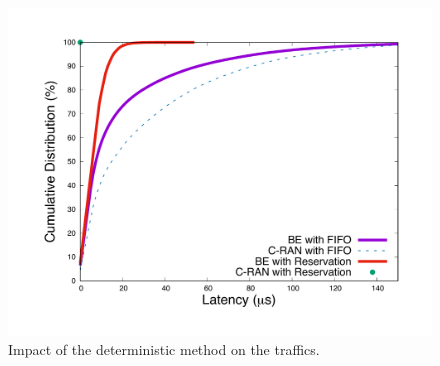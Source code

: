\documentclass[10pt, conference, letterpaper]{IEEEtran}
\begin{document}
  
  
  \begin{figure}[h!]
\begin{center}   

     \includegraphics[scale=0.25]{optim.pdf}
     \caption{Impact of the deterministic method on the traffics.}   \label{fig:optimres}

\end{center}
  \end{figure}
  
  
 

  
  

\end{document}
